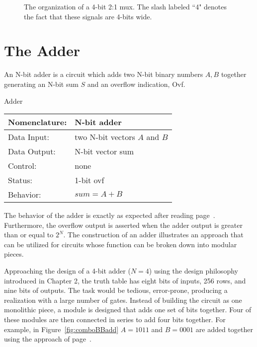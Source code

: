 \begin{figure}[ht]
\caption{The organization of a 4-bit 2:1 mux.  The slash labeled ``4" 
denotes the fact that these signals are 4-bits wide.}
\label{fig:comboBB4x2x1mux}
\end{figure}


\section{The Adder}
An N-bit adder is a circuit which adds two N-bit binary numbers 
$A,B$ together generating an N-bit sum $S$ and an overflow 
indication, Ovf.   

\begin{buildingblock}{Adder}
\label{buildingblock:adder}
\begin{tabular}{|l|p{3.5in}|} \hline                    
Nomenclature:  & N-bit adder				\\ \hline
Data Input:    & two N-bit vectors $A$ and $B$		\\ \hline
Data Output:   & N-bit vector sum			\\ \hline
Control:       & none					\\ \hline
Status:        & 1-bit ovf 				\\ \hline
Behavior:      & $sum = A+B$				\\ \hline
\end{tabular}
\end{buildingblock}

The behavior of the adder is exactly as expected after reading
page~\pageref{page:addition}.  Furthermore, the overflow output is asserted 
when the adder output is greater than or equal to $2^N$.  The construction 
of an adder illustrates an approach that can be utilized for circuits 
whose function can be broken down into modular pieces. 

Approaching the design of a 4-bit adder ($N=4$) using the design 
philosophy introduced in Chapter 2, the truth table has eight bits
of inputs, 256 rows, and nine bits of outputs.  The task would be tedious,
error-prone, producing a realization with a large number of 
gates.  Instead of building the circuit as one monolithic piece, a module 
is designed that adds one set of bits together.  Four of these modules are
then connected in series to add four bits together.
For example, in Figure~\ref{fig:comboBBadd} $A=1011$ and $B=0001$ are added
together using the approach of page~\pageref{page:addition}.

